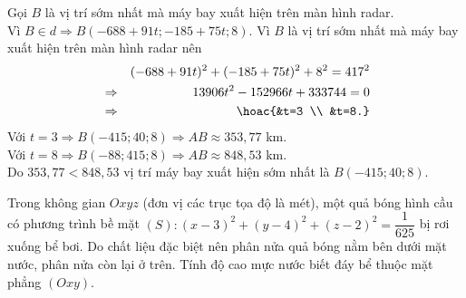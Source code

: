 \begin{bt}
{		Gọi $B$ là vị trí sớm nhất mà máy bay xuất hiện trên màn hình radar. \\
		Vì $B \in d \Rightarrow B(-688+91 t ;-185+75 t ; 8)$.
		Vì $B$ là vị trí sớm nhất mà máy bay xuất hiện trên màn hình radar nên
		\begin{eqnarray*}
			&&(-688+91 t)^2+(-185+75 t)^2+8^2=417^2\\
			&\Rightarrow &13906 t^2-152966 t+333744=0\\
			&\Rightarrow &\hoac{&t=3 \\
				&t=8.}
		\end{eqnarray*}
		Với $t=3 \Rightarrow B(-415 ; 40 ; 8) \Rightarrow A B \approx 353{,}77$ km. \\
		Với $t=8 \Rightarrow B(-88 ; 415 ; 8) \Rightarrow A B \approx 848{,}53$ km.\\
		Do $353{,}77<848{,}53$ vị trí máy bay xuất hiện sớm nhất là $B(-415 ; 40 ; 8)$.
		
	}
\end{bt}

\begin{bt}%
	Trong không gian $Oxyz$ (đơn vị các trục tọa độ là mét), một quả bóng hình cầu có phương trình bề mặt $(S) \colon (x-3)^2+(y-4)^2+(z-2)^2=\dfrac{1}{625}$ bị rơi xuống bể bơi. Do chất liệu đặc biệt nên phân nửa quả bóng nằm bên dưới mặt nước, phân nửa còn lại ở trên. Tính độ cao mực nước biết đáy bể thuộc mặt phẳng $(Oxy)$.
\end{bt}

